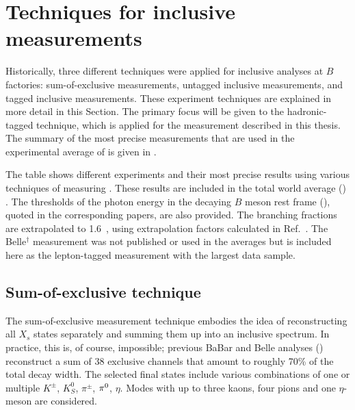 \section{Techniques for inclusive \safeBtoXsgamma measurements}\label{sec:btosgamma_techniques}
Historically, three different techniques were applied for inclusive \BtoXsgamma analyses at $B$ factories: 
sum-of-exclusive measurements,
untagged inclusive measurements, and
tagged inclusive measurements.
These experiment techniques are explained in more detail in this Section.
The primary focus will be given to the hadronic-tagged technique, which is applied for the measurement described in this thesis.
The summary of the most precise measurements that are used in the experimental average of  is given in .

{\renewcommand{\arraystretch}{1.2}
 \begin{table}[!htbp]
     \centering
     \caption{\label{tab:btosgamma_inclusive_summary}
     The table shows different experiments and their most precise results using various techniques of measuring \BtoXsgamma.
     These results are included in the total \BtoXsgamma world average () \cite{Amhis:2022mac,Workman:2022ynf}.
     The thresholds of the photon energy in the decaying $B$ meson rest frame (\EB), quoted in the corresponding papers, are also provided.
     The branching fractions are extrapolated to 1.6~\gev, using extrapolation factors calculated in Ref.~\cite{Buchmuller:2005zv}.
     The Belle$^{\dagger}$ measurement was not published or used in the averages but is included here as the lepton-tagged measurement with the largest data sample.
     }
     
 \end{table}
 }

\subsection{Sum-of-exclusive technique}\label{sec:sum_of_exclusive}

The sum-of-exclusive measurement technique embodies the idea of reconstructing all $X_s$ states separately and summing them up into an inclusive spectrum.
In practice, this is, of course, impossible; previous BaBar and Belle analyses (\cite{BaBar:2012eja,Belle:2014nmp}) reconstruct a sum of 38 exclusive channels that amount to roughly 70\% of the total \BtoXsgamma decay width.
The selected final states include various combinations of one or multiple $K^{\pm}$, $K_S^0$, $\pi^{\pm}$, $\pi^0$, $\eta$.
Modes with up to three kaons, four pions and one $\eta$-meson are considered.


